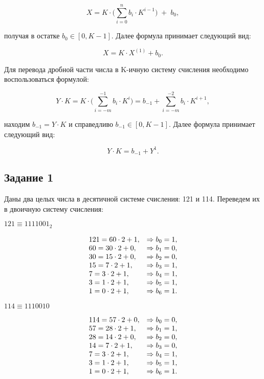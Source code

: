 \documentclass[a4paper,14pt]{extarticle}
\begin{document}
	\[
		X = K \cdot \Biggl(\sum_{i=0}^{n}b_{i} \cdot K^{i-1}\Biggl)\;+\; b_{0},
	\]
	
	\noindent получая в остатке $b_{0} \in [0, K - 1]$. Далее формула принимает следующий вид:
	
	\[
		X = K \cdot X^{(1)} + b_{0}.
	\]
	
	Для перевода дробной части числа в K-ичную систему счисления необходимо воспользоваться формулой:
	
	\[
		Y \cdot K = K \cdot \Biggl(\sum_{i=-m}^{-1}b_{i} \cdot K^{i}\Biggl) =b_{-1} + \sum_{i=-m}^{-2}b_{i} \cdot K^{i+1},
	\]
	
	находим $b_{-1} = Y \cdot K$ и справедливо $b_{-1} \in [0, K - 1]$. Далее формула принимает следующий вид:
	
	\[
		Y \cdot K = b_{-1} + Y^{1}.
	\]
	
	\subsection*{Задание 1}
	Даны два целых числа в десятичной системе счисления: 121 и 114. Переведем их в двоичную систему счисления:
	
	$121 \equiv 1111001_{2}$
	
	\[
	\begin{array}[c]{ll}
		121 = 60 \cdot 2 + 1, &\Rightarrow b_{0} = 1,\\
		60 = 30 \cdot 2 + 0, &\Rightarrow b_{1} = 0,\\
		30 = 15 \cdot 2 + 0, &\Rightarrow b_{2} = 0,\\
		15 = 7 \cdot 2 + 1, &\Rightarrow b_{3} = 1,\\
		7 = 3 \cdot 2 + 1, &\Rightarrow b_{4} = 1,\\
		3 = 1 \cdot 2 + 1, &\Rightarrow b_{5} = 1,\\
		1 = 0 \cdot 2 + 1, &\Rightarrow b_{6} = 1.
	\end{array}
	\]
	
	$114 \equiv 1110010 $
	
	\[
	\begin{array}[c]{ll}
		114 = 57 \cdot 2 + 0, &\Rightarrow b_{0} = 0,\\
		57 = 28 \cdot 2 + 1, &\Rightarrow b_{1} = 1,\\
		28 = 14 \cdot 2 + 0, &\Rightarrow b_{2} = 0,\\
		14 = 7 \cdot 2 + 1, &\Rightarrow b_{3} = 0,\\
		7 = 3 \cdot 2 + 1,  &\Rightarrow b_{4} = 1,\\
		3 = 1 \cdot 2 + 1,  &\Rightarrow b_{5} = 1,\\
		1 = 0 \cdot 2 + 1,  &\Rightarrow b_{6} = 1.
	\end{array}
	\]
	
\end{document}
